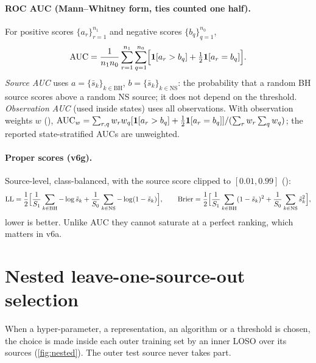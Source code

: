 \paragraph{ROC AUC (Mann--Whitney form, ties counted one half).} For positive scores $\{a_r\}_{r=1}^{n_1}$ and negative
scores $\{b_q\}_{q=1}^{n_0}$,
\begin{equation}
\operatorname{AUC} = \frac{1}{n_1n_0}\sum_{r=1}^{n_1}\sum_{q=1}^{n_0}\Bigl[\mathbf{1}\!\left[a_r>b_q\right]+\tfrac12\mathbf{1}\!\left[a_r=b_q\right]\Bigr]. \label{eq:auc}
\end{equation}
\emph{Source AUC} uses $a=\{\bar s_k\}_{k\in\mathrm{BH}}$, $b=\{\bar s_k\}_{k\in\mathrm{NS}}$: the probability that a random BH
source scores above a random NS source; it does not depend on the threshold. \emph{Observation AUC} (used inside states)
uses all observations. With observation weights $w$ (), $\operatorname{AUC}_w=\sum_{r,q}w_rw_q[\mathbf{1}\!\left[a_r>b_q\right]+
\frac12\mathbf{1}\!\left[a_r=b_q\right]]/(\sum_rw_r\sum_qw_q)$; the reported state-stratified AUCs are unweighted.

\paragraph{Proper scores (v6g).} Source-level, class-balanced, with the source score clipped to $[0.01,0.99]$
():
\begin{equation}
\mathrm{LL} = \frac12\Bigl[\frac{1}{S_1}\sum_{k\in\mathrm{BH}}-\log\tilde s_k + \frac{1}{S_0}\sum_{k\in\mathrm{NS}}-\log(1-\tilde s_k)\Bigr],\qquad
\mathrm{Brier} = \frac12\Bigl[\frac{1}{S_1}\sum_{k\in\mathrm{BH}}(1-\tilde s_k)^2+\frac{1}{S_0}\sum_{k\in\mathrm{NS}}\tilde s_k^2\Bigr],\label{eq:proper}
\end{equation}
lower is better. Unlike AUC they cannot saturate at a perfect ranking, which matters in v6a.

\section{Nested leave-one-source-out selection}\label{sec:nested}

When a hyper-parameter, a representation, an algorithm or a threshold is chosen, the choice is made inside each outer
training set by an inner LOSO over its sources (\cref{fig:nested}). The outer test source never takes part.

